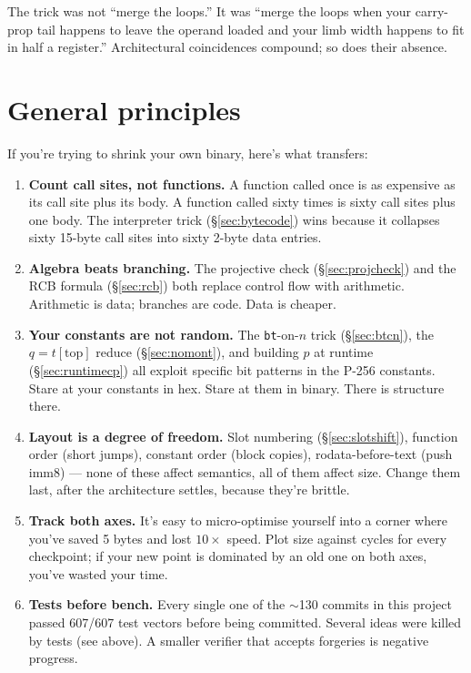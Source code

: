\documentclass[11pt,a4paper]{article}
\begin{document}
The trick was not ``merge the loops.'' It was ``merge the loops when
your carry-prop tail happens to leave the operand loaded and your limb
width happens to fit in half a register.'' Architectural coincidences
compound; so does their absence.

\section{General principles}

If you're trying to shrink your own binary, here's what transfers:

\begin{enumerate}
\item \textbf{Count call sites, not functions.} A function called
  once is as expensive as its call site plus its body. A function
  called sixty times is sixty call sites plus one body. The
  interpreter trick (\S\ref{sec:bytecode}) wins because it collapses
  sixty 15-byte call sites into sixty 2-byte data entries.

\item \textbf{Algebra beats branching.} The projective check
  (\S\ref{sec:projcheck}) and the RCB formula (\S\ref{sec:rcb}) both
  replace control flow with arithmetic. Arithmetic is data;
  branches are code. Data is cheaper.

\item \textbf{Your constants are not random.} The \texttt{bt}-on-$n$
  trick (\S\ref{sec:btcn}), the $q=t[\text{top}]$ reduce
  (\S\ref{sec:nomont}), and building $p$ at runtime
  (\S\ref{sec:runtimecp}) all exploit specific bit patterns in the
  P-256 constants. Stare at your constants in hex. Stare at them in
  binary. There is structure there.

\item \textbf{Layout is a degree of freedom.} Slot numbering
  (\S\ref{sec:slotshift}), function order (short jumps), constant
  order (block copies), rodata-before-text (push imm8) --- none of
  these affect semantics, all of them affect size. Change them last,
  after the architecture settles, because they're brittle.

\item \textbf{Track both axes.} It's easy to micro-optimise yourself
  into a corner where you've saved 5 bytes and lost $10\times$ speed.
  Plot size against cycles for every checkpoint; if your new point is
  dominated by an old one on both axes, you've wasted your time.

\item \textbf{Tests before bench.} Every single one of the $\sim$130
  commits in this project passed 607/607 test vectors before being
  committed. Several ideas were killed by tests (see above). A
  smaller verifier that accepts forgeries is negative progress.
\end{enumerate}
\end{document}
